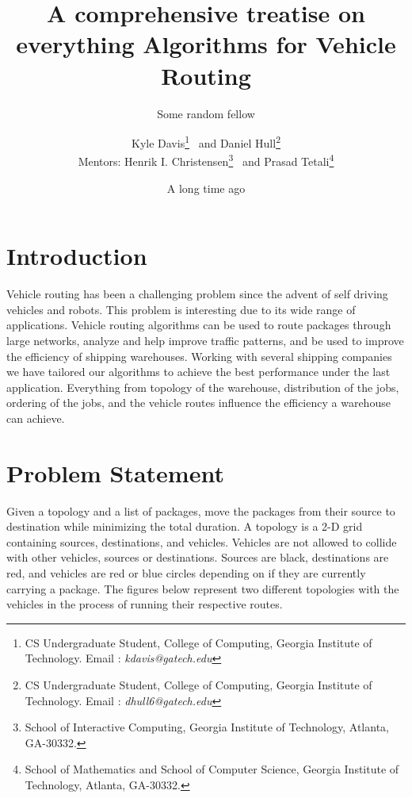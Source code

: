\documentclass[11pt]{article}
\author{Some random fellow\vspace{-2ex}%
  }
\date{A long time ago}
\title{A comprehensive treatise on everything\vspace{-2ex}%
  }
\title{{\bf{\vspace{-8ex}Algorithms for Vehicle Routing}}
}
\author{
Kyle Davis\footnote{CS Undergraduate Student, College of Computing, Georgia Institute of Technology. Email : {\em{kdavis@gatech.edu}}} \ and Daniel Hull\footnote{CS Undergraduate Student, College of Computing, Georgia Institute of Technology. Email : {\em{dhull6@gatech.edu}}} \\
  Mentors: Henrik I. Christensen\footnote{School of Interactive Computing, Georgia Institute of Technology, Atlanta, GA-30332.} \ and Prasad Tetali\footnote{School of Mathematics and School of Computer Science, Georgia Institute of Technology, Atlanta, GA-30332.}
}
\date{}
\begin{document}
\pagestyle{empty}
\maketitle
\thispagestyle{empty}
\vspace*{-1cm}


\section{Introduction}

Vehicle routing has been a challenging problem since the advent of self driving vehicles and robots. This problem is interesting due to its wide range of applications. Vehicle routing algorithms can be used to route packages through large networks, analyze and help improve traffic patterns, and be used to improve the efficiency of shipping warehouses. Working with several shipping companies we have tailored our algorithms to achieve the best performance under the last application. Everything from topology of the warehouse, distribution of the jobs, ordering of the jobs, and the vehicle routes influence the efficiency a warehouse can achieve.

\section{Problem Statement}

Given a topology and a list of packages, move the packages from their source to destination while minimizing the total duration. A topology is a 2-D grid containing sources, destinations, and vehicles. Vehicles are not allowed to collide with other vehicles, sources or destinations. Sources are black, destinations are red, and vehicles are red or blue circles depending on if they are currently carrying a package. The figures below represent two different topologies with the vehicles in the process of running their respective routes.
\end{document}
